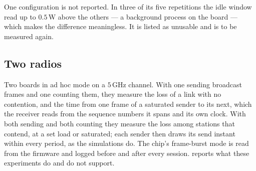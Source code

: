 One configuration is not reported. In three of its five repetitions the idle window read up to
$0.5$\,W above the others --- a background process on the board --- which makes the difference
meaningless. It is listed as unusable and is to be measured again.

\subsection{Two radios}

Two boards in ad hoc mode on a $5$\,GHz channel. With one sending broadcast frames and one
counting them, they measure the loss of a link with no contention, and the time from one frame
of a saturated sender to its next, which the receiver reads from the sequence numbers it spans
and its own clock. With both sending and both counting they measure the loss among stations
that contend, at a set load or saturated; each sender then draws its send instant within every
period, as the simulations do. The chip's frame-burst mode is read from the firmware and logged
before and after every session.  reports what these experiments do and do
not support.
